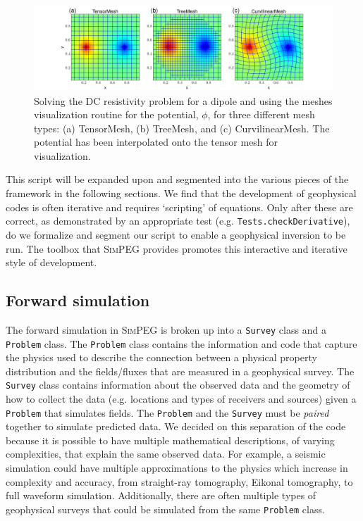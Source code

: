 \documentclass[preprint,review,3p,times,onecolumn,authoryear]{elsarticle}
\newcommand{\SimPEG}{\textsc{SimPEG}\xspace}
\newcommand{\Survey}{\texttt{Survey}\xspace}
\newcommand{\Problem}{\texttt{Problem}\xspace}
\begin{document}
{%
\begin{figure}[ht!]
\centering
\includegraphics[width=15.5cm]{images/ThreeMesh.png}
\caption{Solving the DC resistivity problem for a dipole and using the meshes visualization routine for the potential,
$\phi$, for three different mesh types: (a) TensorMesh, (b) TreeMesh, and (c) CurvilinearMesh. The potential has been interpolated onto the tensor mesh for visualization.}
\label{fig:threeMeshes}
\end{figure}
}

This script will be expanded upon and segmented into the various pieces of
the framework in the following sections. We find that the development of
geophysical codes is often iterative and requires `scripting' of equations.
Only after these are correct, as demonstrated by an appropriate test (e.g. \texttt{Tests.checkDerivative}), do we formalize and segment our script to enable a geophysical
inversion to be run. The toolbox that \SimPEG provides promotes this interactive and
iterative style of development.


\subsection{Forward simulation}

The forward simulation in \SimPEG is broken up into a \Survey class and
a \Problem class.
The \Problem class contains the information and code that capture the physics
used to describe the connection between a physical property distribution and the
fields/fluxes that are measured in a geophysical survey.
The \Survey class contains information about the observed data and
the geometry of how to collect the data (e.g. locations and types of receivers
and sources) given a \Problem that simulates fields. The \Problem
and the \Survey must be \emph{paired} together to simulate predicted data.
We decided on this separation of the code because it is possible to have
multiple mathematical descriptions, of varying complexities, that explain the same
observed data. For example, a seismic simulation could have multiple approximations
to the physics which increase in complexity and accuracy, from straight-ray tomography, Eikonal tomography,
to full waveform simulation. Additionally, there are often multiple types
of geophysical surveys that could be simulated from the same \Problem class.
\end{document}
